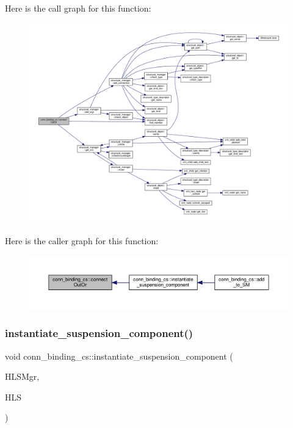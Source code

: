 Here is the call graph for this function\+:
\nopagebreak
\begin{figure}[H]
\begin{center}
\leavevmode
\includegraphics[width=350pt]{db/df4/classconn__binding__cs_aedc1d5c3adcfc3f539d6ca0352dd7547_cgraph}
\end{center}
\end{figure}
Here is the caller graph for this function\+:
\nopagebreak
\begin{figure}[H]
\begin{center}
\leavevmode
\includegraphics[width=350pt]{db/df4/classconn__binding__cs_aedc1d5c3adcfc3f539d6ca0352dd7547_icgraph}
\end{center}
\end{figure}
\mbox{\label{classconn__binding__cs_a3738b716c0672637acb76998cfabbf71}} 
\subsubsection{\texorpdfstring{instantiate\+\_\+suspension\+\_\+component()}{instantiate\_suspension\_component()}}
{\footnotesize\ttfamily void conn\+\_\+binding\+\_\+cs\+::instantiate\+\_\+suspension\+\_\+component (\begin{DoxyParamCaption}\item[{const \hyperlink{hls__manager_8hpp_acd3842b8589fe52c08fc0b2fcc813bfe}{H\+L\+S\+\_\+manager\+Ref}}]{H\+L\+S\+Mgr,  }\item[{const \hyperlink{hls_8hpp_a75d0c73923d0ddfa28c4843a802c73a7}{hls\+Ref}}]{H\+LS }\end{DoxyParamCaption})\hspace{0.3cm}{\ttfamily [protected]}}




